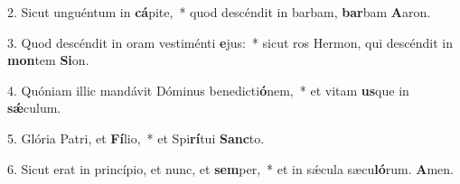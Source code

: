 2. Sicut unguéntum in \textbf{cá}pite,~*  quod descéndit in barbam, \textbf{bar}bam \textbf{A}aron.\

3. Quod descéndit in oram vestiménti \textbf{e}jus:~*  sicut ros Hermon, qui descéndit in \textbf{mon}tem \textbf{Si}on.\

4. Quóniam illic mandávit Dóminus benedicti\textbf{ó}nem,~*  et vitam \textbf{us}que in \textbf{sǽ}culum.\

5. Glória Patri, et \textbf{Fí}lio,~*  et Spi\textbf{rí}tui \textbf{Sanc}to.\

6. Sicut erat in princípio, et nunc, et \textbf{sem}per,~*  et in sǽcula sæcu\textbf{ló}rum. \textbf{A}men.\

